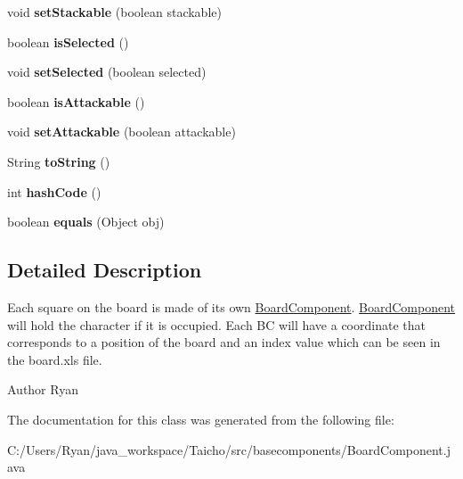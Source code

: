 \begin{DoxyCompactItemize}
\item 
\hypertarget{classbasecomponents_1_1_board_component_ae1ed8320234b2e75e60d9b014bb6269e}{void {\bfseries set\-Stackable} (boolean stackable)}\label{classbasecomponents_1_1_board_component_ae1ed8320234b2e75e60d9b014bb6269e}

\item 
\hypertarget{classbasecomponents_1_1_board_component_a1744723cb2f71d40fb55a6eb430dd506}{boolean {\bfseries is\-Selected} ()}\label{classbasecomponents_1_1_board_component_a1744723cb2f71d40fb55a6eb430dd506}

\item 
\hypertarget{classbasecomponents_1_1_board_component_adcd874effad190d380416af78206d904}{void {\bfseries set\-Selected} (boolean selected)}\label{classbasecomponents_1_1_board_component_adcd874effad190d380416af78206d904}

\item 
\hypertarget{classbasecomponents_1_1_board_component_a110f341de38eefd7d8e8b80321e5746e}{boolean {\bfseries is\-Attackable} ()}\label{classbasecomponents_1_1_board_component_a110f341de38eefd7d8e8b80321e5746e}

\item 
\hypertarget{classbasecomponents_1_1_board_component_a13100901d3dfde725a88cc9aa49d96e5}{void {\bfseries set\-Attackable} (boolean attackable)}\label{classbasecomponents_1_1_board_component_a13100901d3dfde725a88cc9aa49d96e5}

\item 
\hypertarget{classbasecomponents_1_1_board_component_a9c7b53ca74f8741c61ab535ec4f366dd}{String {\bfseries to\-String} ()}\label{classbasecomponents_1_1_board_component_a9c7b53ca74f8741c61ab535ec4f366dd}

\item 
\hypertarget{classbasecomponents_1_1_board_component_a9b28fa3b86ac806f7d2c6736c165cd5d}{int {\bfseries hash\-Code} ()}\label{classbasecomponents_1_1_board_component_a9b28fa3b86ac806f7d2c6736c165cd5d}

\item 
\hypertarget{classbasecomponents_1_1_board_component_a8ba2ad9d46d276b2f1a25d74f96dcfa5}{boolean {\bfseries equals} (Object obj)}\label{classbasecomponents_1_1_board_component_a8ba2ad9d46d276b2f1a25d74f96dcfa5}

\end{DoxyCompactItemize}


\subsection{Detailed Description}
Each square on the board is made of its own \hyperlink{classbasecomponents_1_1_board_component}{Board\-Component}. \hyperlink{classbasecomponents_1_1_board_component}{Board\-Component} will hold the character if it is occupied. Each B\-C will have a coordinate that corresponds to a position of the board and an index value which can be seen in the board.\-xls file. \begin{DoxyAuthor}{Author}
Ryan 
\end{DoxyAuthor}


The documentation for this class was generated from the following file\-:\begin{DoxyCompactItemize}
\item 
C\-:/\-Users/\-Ryan/java\-\_\-workspace/\-Taicho/src/basecomponents/Board\-Component.\-java\end{DoxyCompactItemize}

